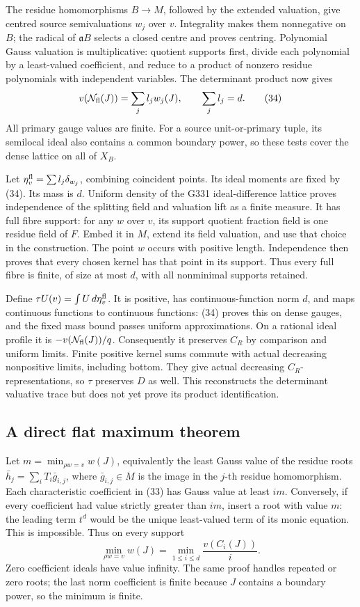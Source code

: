 \documentclass[11pt]{article}
\begin{document}
The residue homomorphisms \(B\to M\), followed by the extended
valuation, give centred source semivaluations \(w_j\) over \(v\).
Integrality makes them nonnegative on \(B\); the radical of
\(\mathfrak a B\) selects a closed centre and proves centring.
Polynomial Gauss valuation is multiplicative: quotient
supports first, divide each polynomial by a least-valued
coefficient, and reduce to a product of nonzero residue
polynomials with independent variables. The determinant
product now gives
\[
 v(\mathcal N_{\rm fl}(J))=\sum_j l_jw_j(J),\qquad
                      \sum_j l_j=d.                          \tag{34}
\]
All primary gauge values are finite. For a source unit-or-primary
tuple, its semilocal ideal also contains a common boundary
power, so these tests cover the dense lattice on all of \(X_B\).

Let \(\eta_v^{\rm fl}=\sum l_j\delta_{w_j}\), combining
coincident points. Its ideal moments are fixed by (34).
Its mass is \(d\). Uniform density of the G331 ideal-difference
lattice proves independence of the splitting field and
valuation lift as a finite measure.
It has full fibre support: for any \(w\) over \(v\), its
support quotient fraction field is one residue field of
\(F\). Embed it in \(M\), extend its field valuation, and
use that choice in the construction. The point \(w\) occurs
with positive length. Independence then proves that every
chosen kernel has that point in its support. Thus every
full fibre is finite, of size at most \(d\), with all
nonminimal supports retained.

Define \(\tau U(v)=\int U\,d\eta_v^{\rm fl}\).
It is positive, has continuous-function norm \(d\), and
maps continuous functions to continuous functions: (34)
proves this on dense gauges, and the fixed mass bound
passes uniform approximations.
On a rational ideal profile it is
\(-v(\mathcal N_{\rm fl}(J))/q\).
Consequently it preserves \(C_R\) by comparison and uniform
limits. Finite positive kernel sums commute with actual
decreasing nonpositive limits, including bottom. They give
actual decreasing \(C_R\)-representations, so \(\tau\)
preserves \(D\) as well.
This reconstructs the determinant valuative trace but does
not yet prove its product identification.

\subsection*{A direct flat maximum theorem}
Let \(m=\min_{\rho w=v}w(J)\), equivalently the least Gauss
value of the residue roots \(\bar h_j=\sum_i T_i\bar g_{i,j}\),
where \(\bar g_{i,j}\in M\) is the image in the \(j\)-th
residue homomorphism.
Each characteristic coefficient in (33) has Gauss value
at least \(im\). Conversely, if every coefficient had
value strictly greater than \(im\), insert a root with
value \(m\): the leading term \(t^d\) would be the unique
least-valued term of its monic equation. This is impossible.
Thus on every support
\[
 \min_{\rho w=v}w(J)=\min_{1\leq i\leq d}\frac{v(C_i(J))}{i}.
                                                               \tag{35}
\]
Zero coefficient ideals have value infinity.
The same proof handles repeated or zero roots; the last
norm coefficient is finite because \(J\) contains a boundary
power, so the minimum is finite.
\end{document}
